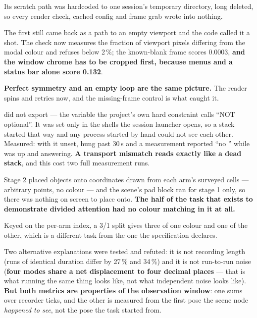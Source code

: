 {Its scratch path was hardcoded to one session's temporary directory, long
deleted, so every render check, cached config and frame grab wrote into
nothing.}

{The first still came back as a path to an empty viewport and the code called it
a shot. The check now measures the fraction of viewport pixels differing from
the modal colour and refuses below 2\,\%; the known-blank frame scores 0.0003,
\textbf{and the window chrome has to be cropped first, because menus and a status
bar alone score 0.132}.}

{\textbf{Perfect symmetry and an empty loop are the same picture.} The reader
spins and retries now, and the missing-frame control is what caught it.}

{ did not export 
--- the variable the project's own hard constraint calls ``NOT optional''. It
was set only in the shells the session launcher opens, so a stack started that
way and any process started by hand could not see each other. Measured: with it
unset,  hung past 30\,s and a measurement reported ``no
'' while  was up and answering.
\textbf{A transport mismatch reads exactly like a dead stack}, and this cost two
full measurement runs.}

{Stage 2 placed objects onto coordinates drawn from each arm's surveyed cells
--- arbitrary points, no colour --- and the scene's pad block ran for stage 1
only, so there was nothing on screen to place onto. \textbf{The half of the task
that exists to demonstrate divided attention had no colour matching in it at
all.}}

{Keyed on the per-arm index, a 3/1 split gives three of one colour and one of
the other, which is a different task from the one the specification declares.}

{Two alternative explanations were tested and refuted: it is not recording
length (runs of identical duration differ by 27\,\% and 34\,\%) and it is not
run-to-run noise (\textbf{four modes share a net displacement to four decimal
places} --- that is what running the same thing looks like, not what independent
noise looks like). \textbf{But both metrics are properties of the observation
window}: one sums over recorder ticks, and the other is measured from the first
pose the scene node \emph{happened to see}, not the pose the task started from.}

